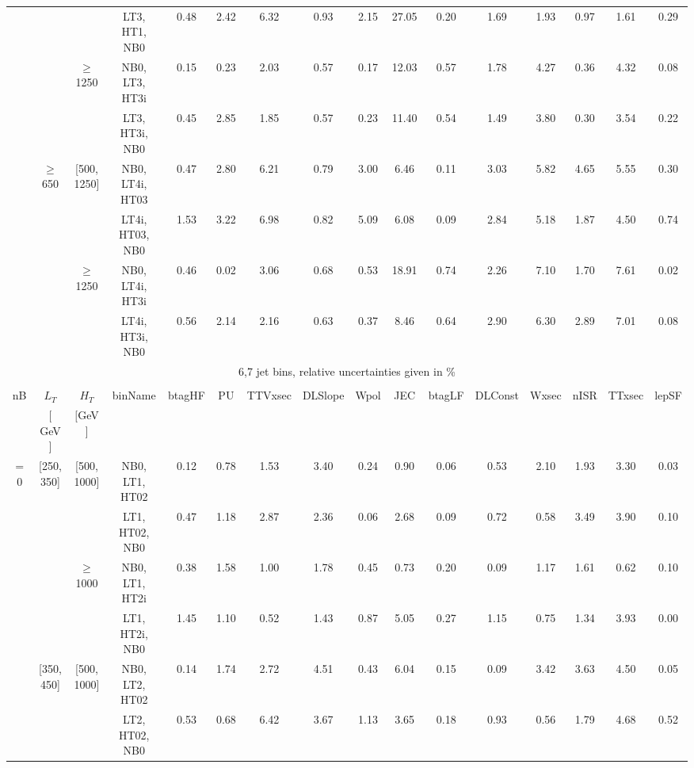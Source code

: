 \begin{sidewaystable}[ht]
\begin{center}
\begin{tabular}{|c | c | c | c | c | c | c | c | c | c | c | c | c | c | c | c | }
  &  &  &LT3, HT1, NB0 & 0.48 & 2.42 & 6.32 & 0.93 & 2.15 & 27.05 & 0.20 & 1.69 & 1.93 & 0.97 & 1.61 & 0.29 \\ 
\cline{3-16}  & & $\geq$ 1250 &NB0, LT3, HT3i & 0.15 & 0.23 & 2.03 & 0.57 & 0.17 & 12.03 & 0.57 & 1.78 & 4.27 & 0.36 & 4.32 & 0.08 \\ 
  &  &  &LT3, HT3i, NB0 & 0.45 & 2.85 & 1.85 & 0.57 & 0.23 & 11.40 & 0.54 & 1.49 & 3.80 & 0.30 & 3.54 & 0.22 \\ 
\cline{2-16}   & $\geq$ 650 & [500, 1250]&NB0, LT4i, HT03 & 0.47 & 2.80 & 6.21 & 0.79 & 3.00 & 6.46 & 0.11 & 3.03 & 5.82 & 4.65 & 5.55 & 0.30 \\ 
  &  &  &LT4i, HT03, NB0 & 1.53 & 3.22 & 6.98 & 0.82 & 5.09 & 6.08 & 0.09 & 2.84 & 5.18 & 1.87 & 4.50 & 0.74 \\ 
\cline{3-16}  & & $\geq$ 1250 &NB0, LT4i, HT3i & 0.46 & 0.02 & 3.06 & 0.68 & 0.53 & 18.91 & 0.74 & 2.26 & 7.10 & 1.70 & 7.61 & 0.02 \\ 
  &  &  &LT4i, HT3i, NB0 & 0.56 & 2.14 & 2.16 & 0.63 & 0.37 & 8.46 & 0.64 & 2.90 & 6.30 & 2.89 & 7.01 & 0.08 \\ 
 \hline 
\multicolumn{16}{|c|}{6,7 jet bins, relative uncertainties given in \%} \\ 
\multicolumn{16}{|c|}{} \\ \hline 
nB &  $L_T$ & $H_T$ & binName & btagHF & PU & TTVxsec & DLSlope & Wpol & JEC & btagLF & DLConst & Wxsec & nISR & TTxsec & lepSF  \\ 
   & $[$ GeV $]$  &  $[$GeV$]$  &  &  &  &  &  &  &  &  &  &  &  &  &   \\ \hline 
\cline{1-16} $=$ 0 & [250, 350] & [500, 1000]&NB0, LT1, HT02 & 0.12 & 0.78 & 1.53 & 3.40 & 0.24 & 0.90 & 0.06 & 0.53 & 2.10 & 1.93 & 3.30 & 0.03 \\ 
  &  &  &LT1, HT02, NB0 & 0.47 & 1.18 & 2.87 & 2.36 & 0.06 & 2.68 & 0.09 & 0.72 & 0.58 & 3.49 & 3.90 & 0.10 \\ 
\cline{3-16}  & & $\geq$ 1000 &NB0, LT1, HT2i & 0.38 & 1.58 & 1.00 & 1.78 & 0.45 & 0.73 & 0.20 & 0.09 & 1.17 & 1.61 & 0.62 & 0.10 \\ 
  &  &  &LT1, HT2i, NB0 & 1.45 & 1.10 & 0.52 & 1.43 & 0.87 & 5.05 & 0.27 & 1.15 & 0.75 & 1.34 & 3.93 & 0.00 \\ 
\cline{2-16}   & [350, 450] & [500, 1000]&NB0, LT2, HT02 & 0.14 & 1.74 & 2.72 & 4.51 & 0.43 & 6.04 & 0.15 & 0.09 & 3.42 & 3.63 & 4.50 & 0.05 \\ 
  &  &  &LT2, HT02, NB0 & 0.53 & 0.68 & 6.42 & 3.67 & 1.13 & 3.65 & 0.18 & 0.93 & 0.56 & 1.79 & 4.68 & 0.52 \\ 

\end{tabular}
\end{center}
\end{sidewaystable}
